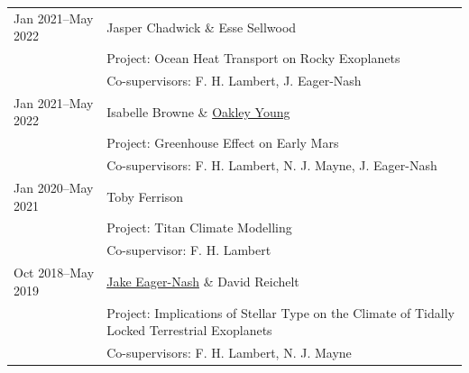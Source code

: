\documentclass[a4paper, 11pt]{article}
\begin{document}
\begin{tabularx}{\linewidth}{@{}l X@{}}
Jan 2021--May 2022 & Jasper Chadwick \& Esse Sellwood \\
                   & Project: Ocean Heat Transport on Rocky Exoplanets \\
                   & Co-supervisors: F. H. Lambert, J. Eager-Nash \\
Jan 2021--May 2022 & Isabelle Browne \& \ul{Oakley Young} \\
                   & Project: Greenhouse Effect on Early Mars \\
                   & Co-supervisors: F. H. Lambert, N. J. Mayne, J. Eager-Nash \\
Jan 2020--May 2021 & Toby Ferrison \\
                   & Project: Titan Climate Modelling \\
                   & Co-supervisor: F. H. Lambert \\
Oct 2018--May 2019 & \ul{Jake Eager-Nash} \& David Reichelt \\
                   & Project: Implications of Stellar Type on the Climate of Tidally Locked Terrestrial Exoplanets \\
                   & Co-supervisors: F. H. Lambert, N. J. Mayne \\
\end{tabularx}
\vspace{-10pt}
\end{document}
